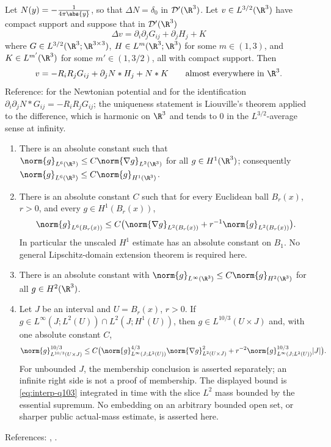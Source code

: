 \documentclass[11pt,reqno]{amsart}
\begin{document}
\begin{externalinput}
\label{ext:newtonian}
Let $N(y)=-\tfrac1{4\pi\abs{y}}$, so that $\Delta N=\delta_{0}$ in
$\mathcal{D}'(\R^{3})$. Let $v\in L^{3/2}(\R^{3})$ have compact support and
suppose that in $\mathcal{D}'(\R^{3})$
\[
  \Delta v=\partial_{i}\partial_{j}G_{ij}+\partial_{j}H_{j}+K
\]
where $G\in L^{3/2}(\R^{3};\R^{3\times3})$, $H\in L^{m}(\R^{3};\R^{3})$ for some
$m\in(1,3)$, and $K\in L^{m'}(\R^{3})$ for some $m'\in(1,3/2)$, all with compact
support. Then
\[
  v=-R_{i}R_{j}G_{ij}+\partial_{j}N*H_{j}+N*K
  \qquad\text{almost everywhere in }\R^{3}.
\]
Reference: \cite[Ch.~2 and Ch.~4]{GilbargTrudinger2001} for the Newtonian
potential and \cite[Ch.~III, V]{Stein1970} for the identification
$\partial_{i}\partial_{j}N*G_{ij}=-R_{i}R_{j}G_{ij}$; the uniqueness statement
is Liouville's theorem applied to the difference, which is harmonic on $\R^{3}$
and tends to $0$ in the $L^{3/2}$-average sense at infinity.
\end{externalinput}

\begin{externalinput}\label{ext:sobolev-ball}\leavevmode
\begin{enumerate}
\item[(i)] There is an absolute constant such that
  $\norm{g}_{L^{6}(\R^{3})}\le C\norm{\nabla g}_{L^{2}(\R^{3})}$ for all
  $g\in H^{1}(\R^{3})$; consequently
  $\norm{g}_{L^{6}(\R^{3})}\le C\norm{g}_{H^{1}(\R^{3})}$.
\item[(ii)] There is an absolute constant $C$ such that for every Euclidean
  ball $B_r(x)$, $r>0$, and every $g\in H^1(B_r(x))$,
  \[
    \norm{g}_{L^6(B_r(x))}
      \le C\bigl(\norm{\nabla g}_{L^2(B_r(x))}
                       +r^{-1}\norm{g}_{L^2(B_r(x))}\bigr).
  \]
  In particular the unscaled $H^1$ estimate has an absolute constant on $B_1$.
  No general Lipschitz-domain extension theorem is required here.
\item[(iii)] There is an absolute constant with
  $\norm{g}_{L^{\infty}(\R^{3})}\le C\norm{g}_{H^{2}(\R^{3})}$ for all
  $g\in H^{2}(\R^{3})$.
\item[(iv)] Let $J$ be an interval and $U=B_r(x)$, $r>0$. If
  $g\in L^\infty(J;L^2(U))\cap L^2(J;H^1(U))$, then
  $g\in L^{10/3}(U\times J)$ and, with one absolute constant $C$,
  \[
  \norm{g}_{L^{10/3}(U\times J)}^{10/3}
   \le C\bigl(\norm{g}_{L^\infty(J;L^2(U))}^{4/3}
                  \norm{\nabla g}_{L^2(U\times J)}^2
       +r^{-2}\norm{g}_{L^\infty(J;L^2(U))}^{10/3}|J|\bigr).
  \]
  For unbounded $J$, the membership conclusion is asserted separately;
  an infinite right side is not a proof of membership. The displayed
  bound is \eqref{eq:interp-q103} integrated in time with the slice
  $L^2$ mass bounded by the essential supremum. No embedding on an
  arbitrary bounded open set, or sharper public actual-mass estimate,
  is asserted here.
\end{enumerate}
References: \cite[Ch.~7]{GilbargTrudinger2001}, \cite[Ch.~V]{Stein1970}.
\end{externalinput}
\end{document}

